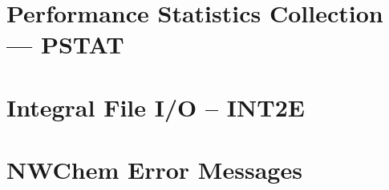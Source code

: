 \appendix
 

\chapter{Performance Statistics Collection --- PSTAT}


\chapter{Integral File I/O -- INT2E}


\chapter{NWChem Error Messages}



